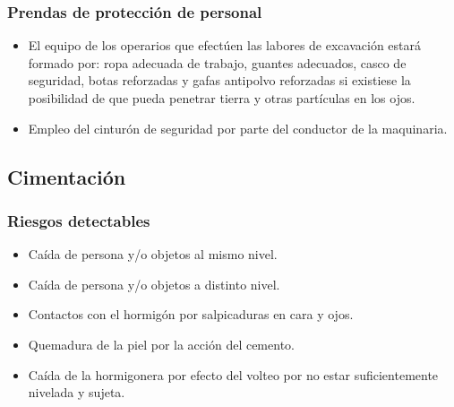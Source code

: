 \subsubsection{Prendas de protección de personal}
\label{subsubsec:sysExcavacion-EPI}
\begin{itemize}
    \item El equipo de los operarios que efectúen las labores de excavación estará formado por: ropa adecuada de trabajo, guantes adecuados, casco de seguridad, botas reforzadas y gafas antipolvo reforzadas si existiese la posibilidad de que pueda penetrar tierra y otras partículas en los ojos.
    \item Empleo del cinturón de seguridad por parte del conductor de la maquinaria.
\end{itemize}
\subsection{Cimentación}
\label{subsec:sys-riesgosCimentacion}
\subsubsection{Riesgos detectables}
\label{subsubsec:sysCimentacion-RD}
\begin{itemize}
    \item Caída de persona y/o objetos al mismo nivel.
    \item Caída de persona y/o objetos a distinto nivel.
    \item Contactos con el hormigón por salpicaduras en cara y ojos.
    \item Quemadura de la piel por la acción del cemento.
    \item Caída de la hormigonera por efecto del volteo por no estar suficientemente nivelada y sujeta.
\end{itemize}
